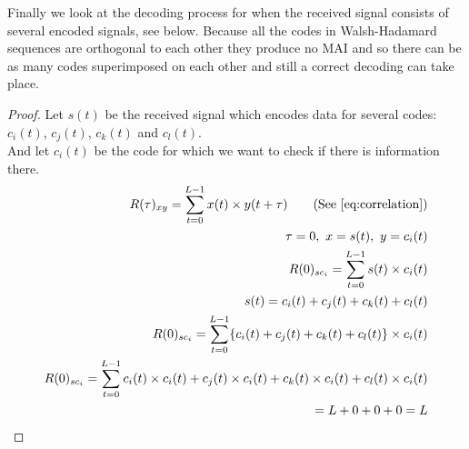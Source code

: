 		Finally we look at the decoding process for when the received signal consists of several encoded signals, see below. 
		Because all the codes in Walsh-Hadamard sequences are orthogonal to each other they produce no MAI and so there can be as many codes superimposed on each other and still a correct decoding can take place. 


		\begin{proof}
			Let $s(t)$ be the received signal which encodes data for several codes: $c_i(t)$, $c_j(t)$, $c_k(t)$ and $c_l(t)$.\\
			And let $c_i(t)$ be the code for which we want to check if there is information there. \\

			\begin{align*}
				R(\tau)_{xy} = \displaystyle\sum_{t = 0} ^ {L - 1} x(t) \times y(t + \tau)	\tag{See \autoref{eq:correlation}}
				\\ \tau = 0,\ x = s(t),\ y = c_i(t)	
				\\ R(0)_{sc_{i}} = \displaystyle\sum_{t = 0} ^ {L - 1} s(t) \times c_i(t)	
				\\ s(t) = c_i(t) + c_j(t) + c_k(t) + c_l(t)															
				\\ R(0)_{sc_{i}} = \displaystyle\sum_{t = 0} ^ {L - 1} \{ c_i(t) + c_j(t) + c_k(t) + c_l(t) \} \times c_i(t)
				\\ R(0)_{sc_{i}} = \displaystyle\sum_{t = 0} ^ {L - 1} c_i(t) \times c_i(t) + c_j(t) \times c_i(t) + c_k(t) \times c_i(t) + c_l(t) \times c_i(t)
				\\ = L + 0 + 0 + 0 = L
			\end{align*}

		\end{proof}
		